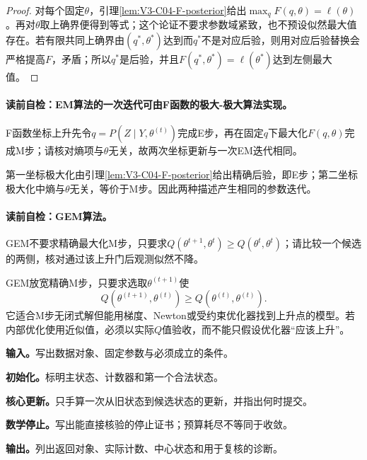 \begin{proof}
对每个固定$\theta$，引理\ref{lem:V3-C04-F-posterior}给出$\max_q F(q,\theta)=\ell(\theta)$。再对$\theta$取上确界便得到等式；这个论证不要求参数域紧致，也不预设似然最大值存在。若有限共同上确界由$(q^*,\theta^*)$达到而$q^*$不是对应后验，则用对应后验替换会严格提高$F$，矛盾；所以$q^*$是后验，并且$F(q^*,\theta^*)=\ell(\theta^*)$达到左侧最大值。
\end{proof}

\paragraph{读前自检：EM算法的一次迭代可由F函数的极大-极大算法实现。}F函数坐标上升先令$q=P(Z\mid Y,\theta^{(t)})$完成E步，再在固定$q$下最大化$F(q,\theta)$完成M步；请核对熵项与$\theta$无关，故两次坐标更新与一次EM迭代相同。\par

第一坐标极大化由引理\ref{lem:V3-C04-F-posterior}给出精确后验，即E步；第二坐标极大化中熵与$\theta$无关，等价于M步。因此两种描述产生相同的参数迭代。

\paragraph{读前自检：GEM算法。}GEM不要求精确最大化M步，只要求$Q(\theta^{t+1},\theta^t)\ge Q(\theta^t,\theta^t)$；请比较一个候选的两侧，核对通过该上升门后观测似然不降。\par

GEM放宽精确M步，只要求选取$\theta^{(t+1)}$使
\[
Q(\theta^{(t+1)},\theta^{(t)})\geq
Q(\theta^{(t)},\theta^{(t)}).
\]
它适合M步无闭式解但能用梯度、Newton或受约束优化器找到上升点的模型。若内部优化使用近似值，必须以实际$Q$值验收，而不能只假设优化器“应该上升”。


\begin{keypointbox}[title={基于 F 函数的交替极大化：五步阅读}]
\textbf{输入。}写出数据对象、固定参数与必须成立的条件。\par
\textbf{初始化。}标明主状态、计数器和第一个合法状态。\par
\textbf{核心更新。}只手算一次从旧状态到候选状态的更新，并指出何时提交。\par
\textbf{数学停止。}写出能直接核验的停止证书；预算耗尽不等同于收敛。\par
\textbf{输出。}列出返回对象、实际计数、中心状态和用于复核的诊断。
\end{keypointbox}

